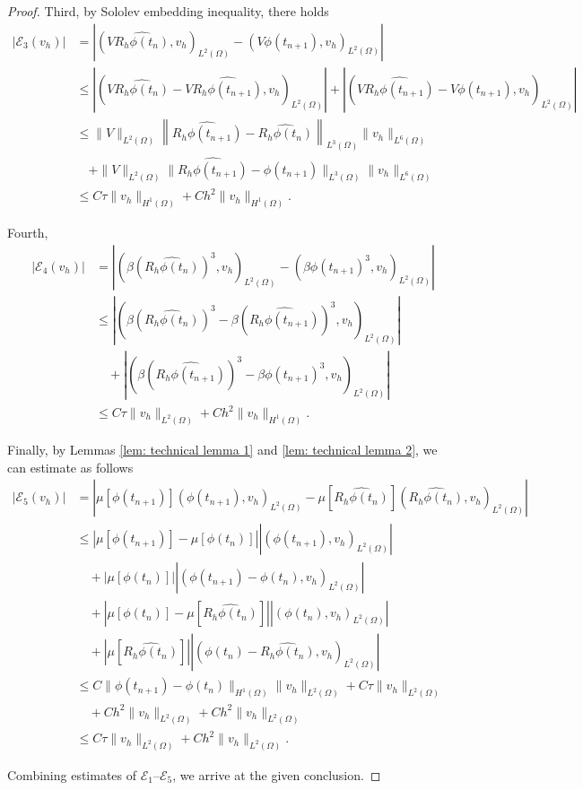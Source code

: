 \documentclass{siamart250211}
\def\nn{\nonumber}
\begin{document}
\begin{proof}
Third, by Sololev embedding inequality, there holds
\begin{align}
	|\mathcal{E}_3(v_h)| & = \left|(V\widehat{R_h\phi(t_{n})}, v_h)_{L^2(\Omega)}  - (V\phi(t_{n+1}), v_h)_{L^2(\Omega)} \right| \nn \\
    & \le \left|(V\widehat{R_h\phi(t_{n})} - V\widehat{R_h\phi(t_{n+1})}, v_h )_{L^2(\Omega)}\right|  + \left|(V\widehat{R_h\phi(t_{n+1})} - V\phi(t_{n+1}), v_h )_{L^2(\Omega)}\right| \nn \\
	& \le \|V\|_{L^2(\Omega)}\left\|\widehat{R_h\phi(t_{n+1})} - \widehat{R_h\phi(t_{n})}\right\|_{L^3(\Omega)}\|v_h\|_{L^6(\Omega)} \nn  \\
	& \quad + \|V\|_{L^2(\Omega)}\|\widehat{R_h\phi(t_{n+1})} - \phi(t_{n+1})\|_{L^3(\Omega)}\|v_h\|_{L^6(\Omega)} \nn \\
	& \le C \tau \|v_h\|_{H^1(\Omega)} + C h^2\|v_h\|_{H^1(\Omega)}.
\end{align}

Fourth, 
\begin{align}
	|\mathcal{E}_4(v_h)| & = \left|(\beta (\widehat{R_h\phi(t_{n})})^3, v_h)_{L^2(\Omega)} - (\beta \phi(t_{n+1})^3, v_h)_{L^2(\Omega)} \right|\nn \\ & \le |(\beta (\widehat{R_h\phi(t_{n})})^3-\beta (\widehat{R_h\phi(t_{n+1})})^3, v_h)_{L^2(\Omega)}| \nn \\
	& \quad + |(\beta (\widehat{R_h\phi(t_{n+1})} )^3-\beta \phi(t_{n+1})^3, v_h)_{L^2(\Omega)}| \nn \\
	& \le C \tau \|v_h\|_{L^2(\Omega)} + C h^2\|v_h\|_{H^1(\Omega)}.
\end{align}

Finally, by Lemmas \ref{lem: technical lemma 1} and \ref{lem: technical lemma 2}, we can estimate as follows
\begin{align}
	|\mathcal{E}_5(v_h)|  & = \left| \mu[\phi(t_{n+1})] (\phi(t_{n+1}),v_h)_{L^2(\Omega)} - \mu[\widehat{R_h\phi(t_{n})}] (\widehat{R_h\phi(t_{n})},v_h)_{L^2(\Omega)} \right| \nn \\ & \le |\mu[\phi(t_{n+1})] - \mu[\phi(t_{n})]||(\phi(t_{n+1}),v_h)_{L^2(\Omega)}| \nn \\
	& \quad + | \mu[\phi(t_{n})]||(\phi(t_{n+1}) - \phi(t_n),v_h)_{L^2(\Omega)}| \nn \\
	& \quad + |\mu[\phi(t_{n})] - \mu[\widehat{R_h\phi(t_{n})}]||(\phi(t_{n}),v_h)_{L^2(\Omega)}| \nn \\
	& \quad + |\mu[\widehat{R_h\phi(t_{n})}]||(\phi(t_{n}) - \widehat{R_h\phi(t_{n})},v_h)_{L^2(\Omega)}| \nn \\
	& \le C \|\phi(t_{n+1}) - \phi(t_{n})\|_{H^1(\Omega)}\|v_h\|_{L^2(\Omega)} + C\tau\|v_h\|_{L^2(\Omega)} \nn \\
	& \quad  + C h^2 \|v_h\|_{L^2(\Omega)} + C h^2\|v_h\|_{L^2(\Omega)} \nn \\
	& \le C \tau \|v_h\|_{L^2(\Omega)} + Ch^2\|v_h\|_{L^2(\Omega)}.
\end{align}

Combining estimates of $\mathcal{E}_1$--$\mathcal{E}_5$, we arrive at the given conclusion.
\end{proof}
\end{document}
